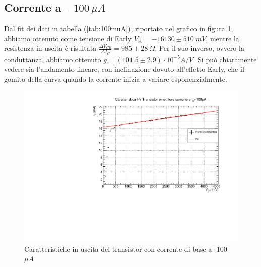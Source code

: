 \documentclass[]{article}
\begin{document}
\subsection{Corrente a $ -100\,\mu A $}
Dal fit dei dati in tabella (\ref{tab:100muA}), riportato nel grafico in figura \ref{fig:corrente 100}, abbiamo ottenuto come tensione di Early $ V_{A}=-16130\pm510\ mV $, mentre la resistenza in uscita è risultata $ \frac{\Delta V_{CE}}{\Delta I _{C}}=985\pm28\ \Omega$. Per il suo inverso, ovvero la conduttanza, abbiamo ottenuto $ g=(101.5\pm2.9)\cdot 10^{-5} A/V $. Si può chiaramente vedere sia l'andamento lineare, con inclinazione dovuto all'effetto Early, che il gomito della curva quando la corrente inizia a variare esponenzialmente.
	\begin{figure}[H]
		\centering
		\includegraphics[width=0.9\linewidth]{../100 muA/c1}
		\caption{Caratteristiche in uscita del transistor con corrente di base a -100 $ \mu A $}
		\label{fig:corrente 100}
	\end{figure}
\end{document}

